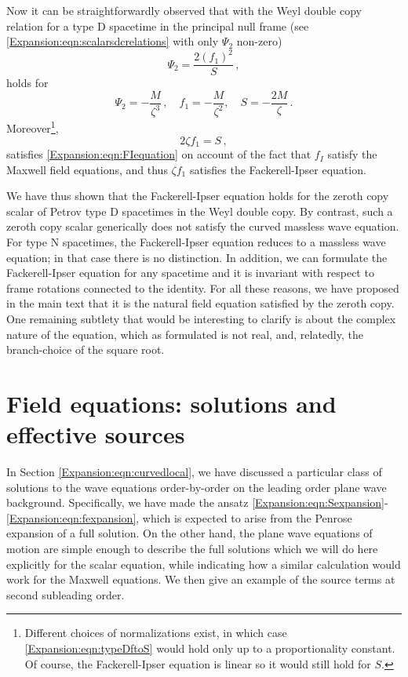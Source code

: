 	Now it can be straightforwardly observed that with the Weyl double copy relation for a type D spacetime in the principal null frame (see \eqref{Expansion:eqn:scalarsdcrelations} with only $\Psi_2$ non-zero)
	\begin{equation}
	\Psi_2 = \frac{2 (f_1)^2}{S} \, , 
	\end{equation}
	holds for \cite{Luna:2018dpt}
	\begin{equation}
	\Psi_2 = -\frac{M}{\zeta^3} \, , \quad  f_1 =  -\frac{M}{\zeta^2}, \quad S = -\frac{2 M}{\zeta}\, .
	\end{equation}
	Moreover\footnote{Different choices of normalizations exist, in which case \eqref{Expansion:eqn:typeDftoS} would hold only up to a proportionality constant. Of course, the Fackerell-Ipser equation is linear so it would still hold for $S$.}, 
	\begin{equation}\label{Expansion:eqn:typeDftoS}
	2 \zeta f_1 = S \, ,
	\end{equation}
	satisfies \eqref{Expansion:eqn:FIequation} on account of the fact that $f_I$ satisfy the Maxwell field equations, and thus $\zeta f_1$ satisfies the Fackerell-Ipser equation.
	
	We have thus shown that the Fackerell-Ipser equation holds for the zeroth copy scalar of Petrov type D spacetimes in the Weyl double copy. By contrast, such a zeroth copy scalar generically does not satisfy the curved massless wave equation. For type N spacetimes, the Fackerell-Ipser equation reduces to a massless wave equation; in that case there is no distinction. In addition, we can formulate the Fackerell-Ipser equation for any spacetime and it is invariant with respect to frame rotations connected to the identity. For all these reasons, we have proposed in the main text that it is the natural field equation satisfied by the zeroth copy. One remaining subtlety that would be interesting to clarify is about the complex nature of the equation, which as formulated is not real, and, relatedly, the branch-choice of the square root.
	
	\chapter{Field equations: solutions and effective sources}\label{Expansion:app:leadingequations}
	
	In Section \ref{Expansion:eqn:curvedlocal}, we have discussed a particular class of solutions to the wave equations order-by-order on the leading order plane wave background. Specifically, we have made the ansatz \eqref{Expansion:eqn:Sexpansion}-\eqref{Expansion:eqn:fexpansion}, which is expected to arise from the Penrose expansion of a full solution. On the other hand, the plane wave equations of motion are simple enough to describe the full solutions which we will do here explicitly for the scalar equation, while indicating how a similar calculation would work for the Maxwell equations. We then give an example of the source terms at second subleading order.
	

